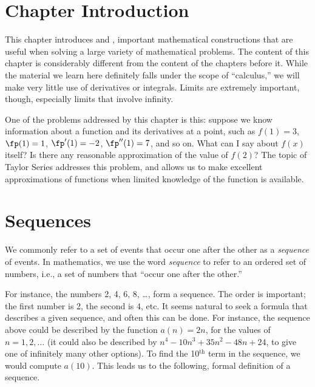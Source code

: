 \iflatexml\section*{Chapter Introduction}\fi

This chapter introduces  and , important mathematical constructions that are useful when solving a large variety of mathematical problems. The content of this chapter is considerably different from the content of the chapters before it. While the material we learn here definitely falls under the scope of ``calculus,'' we will make very little use of derivatives or integrals. Limits are extremely important, though, especially limits that involve infinity. 

One of the problems addressed by this chapter is this: suppose we know information about a function and its derivatives at a point, such as  $f(1) = 3$, $\fp(1) = 1$, $\fp'(1) = -2$, $\fp''(1) = 7$, and so on. What can I say about $f(x)$ itself? Is there any reasonable approximation of the value of $f(2)$? The topic of Taylor Series addresses this problem, and allows us to make excellent approximations of functions when limited knowledge of the function is available.

\section{Sequences}\label{sec:sequences}

We commonly refer to a set of events that occur one after the other as a \textit{sequence} of events. In mathematics, we use the word \textit{sequence} to refer to an ordered set of numbers, i.e., a set of numbers that ``occur one after the other.''

For instance, the numbers 2, 4, 6, 8, \ldots, form a sequence. The order is important; the first number is 2, the second is 4, etc. It seems natural to seek a formula that describes a given sequence, and often this can be done. For instance, the sequence above could be described by the function $a(n) = 2n$, for the values of $n = 1, 2, \dotsc$ (it could also be described by $n^4-10 n^3+35 n^2-48n+24$, to give one of infinitely many other options). To find the 10$^\text{th}$ term in the sequence, we would compute $a(10)$. This leads us to the following, formal definition of a sequence.


